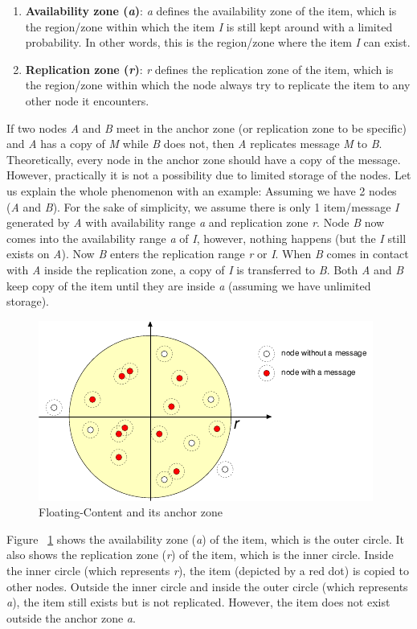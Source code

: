 \begin{enumerate}
  \item \textbf{Availability zone (\textit{a})}: \textit{a} defines the availability zone of the item, which is the region/zone within which the item \textit{I} is still kept around with a limited probability. In other words, this is the region/zone where the item \textit{I} can exist.
  \item \textbf{Replication zone (\textit{r})}: \textit{r} defines the replication zone of the item, which is the region/zone within which the node always try to replicate the item to any other node it encounters.
\end{enumerate}
\vspace{3mm}
If two nodes \textit{A} and \textit{B} meet in the anchor zone (or replication zone to be specific) and \textit{A} has a copy of \textit{M} while \textit{B} does not, then \textit{A} replicates message \textit{M} to \textit{B}. Theoretically, every node in the anchor zone should have a copy of the message. However, practically it is not a possibility due to limited storage of the nodes.
\vspace{3mm}
Let us explain the whole phenomenon with an example:
Assuming we have 2 nodes (\textit{A} and \textit{B}). For the sake of simplicity, we assume there is only 1 item/message \textit{I} generated by \textit{A} with availability range \textit{a} and replication zone \textit{r}. Node \textit{B} now comes into the availability range \textit{a} of \textit{I}, however, nothing happens (but the \textit{I} still exists on \textit{A}). Now \textit{B} enters the replication range \textit{r} or \textit{I}. When \textit{B} comes in contact with \textit{A} inside the replication zone, a copy of \textit{I} is transferred to \textit{B}. Both \textit{A} and \textit{B} keep copy of the item until they are inside \textit{a} (assuming we have unlimited storage).

\begin{figure}[h]
\centering
\includegraphics{./figures/anchor-zone}
\caption{Floating-Content and its anchor zone \cite{floating-content}}
\label{fig:floating-content}
\end{figure}
Figure ~\ref{fig:floating-content} shows the availability zone (\textit{a}) of the item, which is the outer circle. It also shows the replication zone (\textit{r}) of the item, which is the inner circle. Inside the inner circle (which represents \textit{r}), the item (depicted by a red dot) is copied to other nodes. Outside the inner circle and inside the outer circle (which represents \textit{a}), the item still exists but is not replicated. However, the item does not exist outside the anchor zone \textit{a}.

